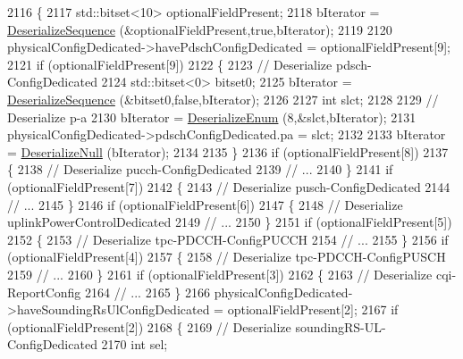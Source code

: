 \begin{DoxyCode}
2116 \{
2117   std::bitset<10> optionalFieldPresent;
2118   bIterator = \hyperlink{classns3_1_1Asn1Header_a58c68bb97ba3fe2e8fcdd7c208d672b2}{DeserializeSequence} (&optionalFieldPresent,\textcolor{keyword}{true},bIterator);
2119 
2120   physicalConfigDedicated->havePdschConfigDedicated = optionalFieldPresent[9];
2121   \textcolor{keywordflow}{if} (optionalFieldPresent[9])
2122     \{
2123       \textcolor{comment}{// Deserialize pdsch-ConfigDedicated}
2124       std::bitset<0> bitset0;
2125       bIterator = \hyperlink{classns3_1_1Asn1Header_a58c68bb97ba3fe2e8fcdd7c208d672b2}{DeserializeSequence} (&bitset0,\textcolor{keyword}{false},bIterator);
2126 
2127       \textcolor{keywordtype}{int} slct;
2128 
2129       \textcolor{comment}{// Deserialize p-a}
2130       bIterator = \hyperlink{classns3_1_1Asn1Header_a4fcc253e0eec3483c775b005c1875f2d}{DeserializeEnum} (8,&slct,bIterator);
2131       physicalConfigDedicated->pdschConfigDedicated.pa = slct;
2132 
2133       bIterator = \hyperlink{classns3_1_1Asn1Header_a29bd4508f3f1ef636b3480f524fac0ce}{DeserializeNull} (bIterator);
2134 
2135     \}
2136   \textcolor{keywordflow}{if} (optionalFieldPresent[8])
2137     \{
2138       \textcolor{comment}{// Deserialize pucch-ConfigDedicated}
2139       \textcolor{comment}{// ...}
2140     \}
2141   \textcolor{keywordflow}{if} (optionalFieldPresent[7])
2142     \{
2143       \textcolor{comment}{// Deserialize pusch-ConfigDedicated}
2144       \textcolor{comment}{// ...}
2145     \}
2146   \textcolor{keywordflow}{if} (optionalFieldPresent[6])
2147     \{
2148       \textcolor{comment}{// Deserialize uplinkPowerControlDedicated}
2149       \textcolor{comment}{// ...}
2150     \}
2151   \textcolor{keywordflow}{if} (optionalFieldPresent[5])
2152     \{
2153       \textcolor{comment}{// Deserialize tpc-PDCCH-ConfigPUCCH}
2154       \textcolor{comment}{// ...}
2155     \}
2156   \textcolor{keywordflow}{if} (optionalFieldPresent[4])
2157     \{
2158       \textcolor{comment}{// Deserialize tpc-PDCCH-ConfigPUSCH}
2159       \textcolor{comment}{// ...}
2160     \}
2161   \textcolor{keywordflow}{if} (optionalFieldPresent[3])
2162     \{
2163       \textcolor{comment}{// Deserialize cqi-ReportConfig}
2164       \textcolor{comment}{// ...}
2165     \}
2166   physicalConfigDedicated->haveSoundingRsUlConfigDedicated = optionalFieldPresent[2];
2167   \textcolor{keywordflow}{if} (optionalFieldPresent[2])
2168     \{
2169       \textcolor{comment}{// Deserialize soundingRS-UL-ConfigDedicated}
2170       \textcolor{keywordtype}{int} sel;

\end{DoxyCode}
